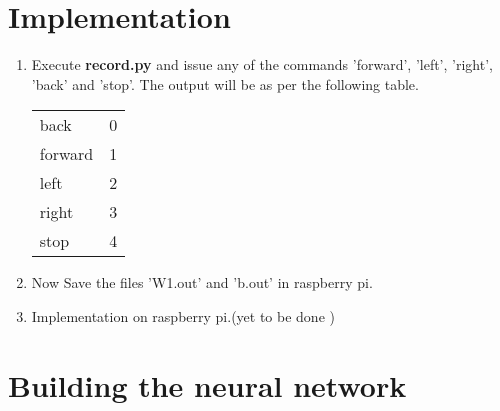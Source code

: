 \documentclass[journal,12pt,twocolumn]{IEEEtran}
\renewcommand\thesection{\arabic{section}}
\begin{document}
%
%	


%
\section{Implementation}
\begin{enumerate}[label=\thesection.\arabic*
,ref=\thesection.\theenumi]
\item Execute \textbf{record.py} and issue any of the commands 'forward', 'left', 'right', 'back' 
and 'stop'. The output will be as per the following table.
\begin{center}
\begin{tabular}{ |l|l| } 
 \hline
 back    & 0  \\ 
 forward & 1  \\ 
 left    & 2  \\
 right   & 3  \\
 stop    & 4  \\ 
 \hline
\end{tabular}
\end{center}

%
\item Now Save the files 'W1.out' and 'b.out' in raspberry pi. 
\item Implementation on raspberry pi.(yet to be done )

\end{enumerate}

\section{Building the neural network}
\end{document}
